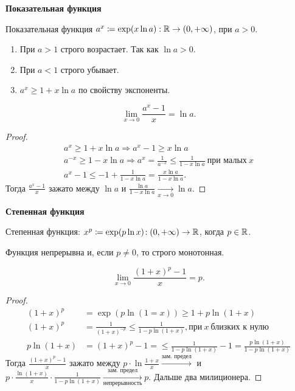 \textbf{Показательная функция}
\begin{definition}
    Показательная функция $a^x \coloneqq \exp(x \ln a): \mathbb{R} \to (0, +\infty)$, при $a > 0$.
\end{definition}
\begin{properties}
    \begin{enumerate}
        \item При $a > 1$ строго возрастает. Так как $\ln a > 0$. 
        \item При $a < 1$ строго убывает.
        \item  $a^x \ge 1 + x \ln a$ по свойству экспоненты.
    \end{enumerate}
\end{properties}
\begin{theorem}
     \[
         \lim_{x \to 0} \frac{a^x - 1}{x} = \ln a
    .\] 
\end{theorem}
\begin{proof}
    \begin{align*}
        a^x \ge 1 + x \ln a \Rightarrow  a^x - 1 \ge x \ln a \\
        a^{-x} \ge 1 - x \ln a \Rightarrow a^x = \frac{1}{a^{-x}} \le \frac{1}{1 - x \ln a}\ \text{при малых}\ x \\
        a^x - 1 \le -1 + \frac{1}{1 - x \ln a} = \frac{x \ln a}{1 - x \ln a}.
        \end{align*}
        Тогда $\frac{a^x - 1}{x}$ зажато между $\ln a$ и  $\frac{\ln a}{1 - x \ln a} \xrightarrow[x \to 0]{} \ln a$. 
\end{proof}

\textbf{Степенная функция}
\begin{definition}
    Степенная функция: $x^p \coloneqq \exp(p \ln x)\!: (0, +\infty) \to \mathbb{R}$, когда  $p \in \mathbb{R}$.

    Функция непрерывна и, если  $p \neq 0$, то строго монотонная.
\end{definition}

\begin{theorem}
    \[
        \lim_{x\to 0} \frac{(1+x)^p - 1}{x} = p
    .\] 
\end{theorem}
\begin{proof}
    \begin{align*}
        (1+x)^p &= \exp(p \ln(1=x))  \ge 1 + p \ln(1+x) \\
        (1+x)^p &= \frac{1}{(1+x)^{-p}} \le \frac{1}{1 - p \ln (1+x)}, \text{при}\ x\ \text{близких к нулю}\\
        p \ln (1+x) &= (1+x)^p - 1 = \le \frac{1}{1-p\ln(1+x)} - 1 = \frac{p\ln(1+x)}{1 - p \ln(1+x)}
    \end{align*}
    Тогда $\frac{(1+x)^p - 1}{x}$ зажато между $p \cdot \ln\frac{1+x}{x} \xrightarrow{\text{зам. предел}}$ и $p \cdot \frac{\ln(1+x)}{x} \cdot \frac{1}{1 - p \ln (1+x)} \xrightarrow [\text{непрерывность}]{\text{зам. предел}} p$. Дальше два милиционера.
\end{proof}

